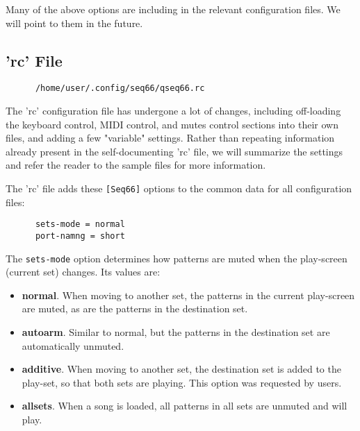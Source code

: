       Many of the above options are including in the relevant configuration
      files.  We will point to them in the future.

\subsection{'rc' File}
\label{subsec:configuration_rc}

   \begin{verbatim}
      /home/user/.config/seq66/qseq66.rc
   \end{verbatim}

   The 'rc' configuration file has undergone a lot of changes, including
   off-loading the keyboard control, MIDI control, and mutes control sections
   into their own files, and adding a few "variable" settings.
   Rather than repeating information already present in the self-documenting
   'rc' file, we will summarize the settings and refer the reader to the sample
   files for more information.

   The 'rc' file adds these \texttt{[Seq66]} options to the common
   data for all configuration files:

   \begin{verbatim}
      sets-mode = normal
      port-namng = short
   \end{verbatim}

%
%

   The \texttt{sets-mode} option determines how patterns are muted when the
   play-screen (current set) changes.  Its values are:

   \begin{itemize}
      \item \textbf{normal}.
         When moving to another set, the patterns in the
         current play-screen are muted, as are the patterns in the destination
         set.
      \item \textbf{autoarm}.
         Similar to normal, but the patterns in the
         destination set are automatically unmuted.
      \item \textbf{additive}.
         When moving to another set, the destination set
         is added to the play-set, so that both sets are playing.
         This option was requested by users.
      \item \textbf{allsets}.
         When a song is loaded, all patterns in all sets are unmuted and will
         play.
   \end{itemize}

